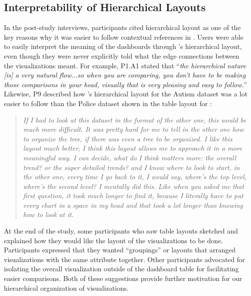\subsection{Interpretability of Hierarchical Layouts}
\par In the post-study interviews, participants cited hierarchical layout as one of the key reasons why it was easier to follow contextual references in \system. Users were able to easily interpret the meaning of the dashboards through \system's hierarchical layout, even though they were never explicitly told what the edge connections between the visualizations meant. For example, P1.A1 stated that ``\textit{the hierarchical nature [is] a very natural flow...so when you are comparing, you don't have to be making those comparisons in your head, visually that is very pleasing and easy to follow.}'' %
Likewise, P9 described how \system's hierarchical layout for the Autism dataset was a lot easier to follow than the Police dataset shown in the table layout for \cluster:
\begin{quote}
\textit{If I had to look at this dataset in the format of the other one, this would be much more difficult. It was pretty hard for me to tell in the other one how to organize the tree, if there was even a tree to be organized. I like this layout much better, I think this layout allows me to approach it in a more meaningful way. I can decide, what do I think matters more: the overall trend? or the super detailed trends? and I know where to look to start, in the other one, every time I go back to it, I would say, where's the top level, where's the second level? I mentally did this. Like when you asked me that first question, it took much longer to find it, because I literally have to put every chart in a space in my head and that took a lot longer than knowing how to look at it.}
\end{quote}
At the end of the study, some participants who saw table layouts sketched and explained how they would like the layout of the visualizations to be done. Participants expressed that they wanted ``groupings'' or layouts that arranged visualizations with the same attribute together. Other participants advocated for isolating the overall visualization outside of the dashboard table for facilitating easier comparisons. Both of these suggestions provide further motivation for our hierarchical organization of visualizations. %
